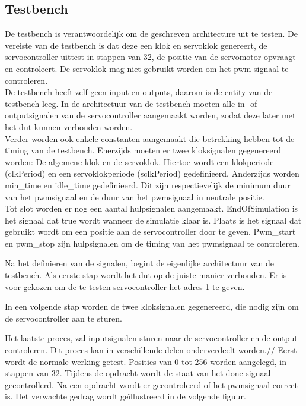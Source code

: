 \subsection{Testbench}

De testbench is verantwoordelijk om de geschreven architecture uit te testen. De vereiste van de testbench is dat deze een klok en servoklok genereert, de servocontroller uittest in stappen van 32, de positie van de servomotor opvraagt en controleert. De servoklok mag niet gebruikt worden om het \gls{pwm} signaal te controleren.\\

\noindent
De testbench heeft zelf geen input en outputs, daarom is de entity van de testbench leeg. In de architectuur van de testbench moeten alle in- of outputsignalen  van de servocontroller aangemaakt worden, zodat deze later met het \gls{dut} kunnen verbonden worden.\\

\noindent
Verder worden ook enkele constanten aangemaakt die betrekking hebben tot de timing van de testbench. Enerzijds moeten er twee kloksignalen gegenereerd worden: De algemene klok en de servoklok. Hiertoe wordt een klokperiode (clkPeriod) en een servoklokperiode (sclkPeriod) gedefinieerd. Anderzijds worden min\_time en idle\_time gedefinieerd. Dit zijn respectievelijk de minimum duur van het \gls{pwm}signaal en de duur van het \gls{pwm}signaal in neutrale positie.\\

\noindent
Tot slot worden er nog een aantal hulpsignalen aangemaakt. EndOfSimulation is het signaal dat true wordt wanneer de simulatie klaar is. Plaats is het signaal dat gebruikt wordt om een positie aan de servocontroller door te geven. Pwm\_start en pwm\_stop zijn hulpsignalen om de timing van het \gls{pwm}signaal te controleren. 


Na het definieren van de signalen, begint de eigenlijke architectuur van de testbench. Als eerste stap wordt het \gls{dut} op de juiste manier verbonden. Er is voor gekozen om de te testen servocontroller het adres 1 te geven.


In een volgende stap worden de twee kloksignalen gegenereerd, die nodig zijn om de servocontroller aan te sturen.

Het laatste proces, zal inputsignalen sturen naar de servocontroller en de output controleren. Dit proces kan in verschillende delen onderverdeelt worden.//
\noindent
Eerst wordt de normale werking getest. Posities van 0 tot 256 worden aangelegd, in stappen van 32. Tijdens de opdracht wordt de staat van het done signaal gecontrollerd. Na een opdracht wordt er gecontroleerd of het \gls{pwm}signaal correct is. Het verwachte gedrag wordt ge\"{i}llustreerd in de volgende figuur.\\

